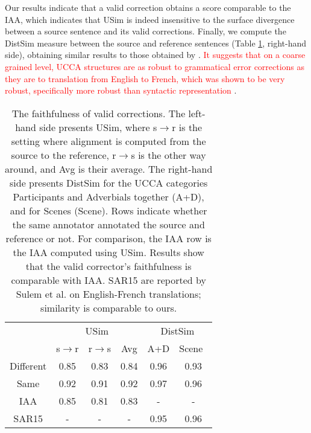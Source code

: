 \documentclass[a4paper, 11pt]{article}
\begin{document}
Our results indicate that a valid correction obtains a score comparable
to the IAA, which indicates that {\sc USim} is indeed
insensitive to the surface divergence between a source sentence and its valid corrections.
Finally, we compute the {\sc DistSim} measure
between the source and reference sentences (Table \ref{tab:Distances}, right-hand side),
obtaining similar results to those obtained by . \textcolor{red}{It suggests that on a coarse grained level, UCCA structures are as robust to grammatical error corrections as they are to translation from English to French, which was shown to be very robust, specifically more robust than syntactic representation \cite{sulem2015conceptual}}.
\begin{table}
	\small
	\centering
	\singlespacing
	\begin{tabular}{c|c|c|c||c|c|}
		\cline{2-6} 
		& \multicolumn{3}{c||}{\sc USim} & \multicolumn{2}{c|}{\sc DistSim}\\ \cline{2-6}
		& s$\rightarrow$r & r$\rightarrow$s & Avg & A+D & Scene\
		\\
		\hline
		Different & 0.85 & 0.83 & 0.84 & 0.96 & 0.93
		\\
		Same & 0.92 & 0.91 & 0.92 & 0.97 & 0.96
		\\
		\hline
		\hline
		IAA & 0.85 & 0.81 & 0.83 & - & -
		\\
		\hline
		SAR15 & - & - & - & 0.95 & 0.96 \\
		\hline
	\end{tabular}
	\caption{\label{tab:Distances}
		The faithfulness of valid corrections.
		The left-hand side presents {\sc USim},
		where s$\rightarrow$r is the setting where alignment is computed from the source to the reference,
		r$\rightarrow$s is the other way around, and Avg is their average.
		The right-hand side presents {\sc DistSim} for the UCCA categories Participants and Adverbials
		together (A+D), and for Scenes (Scene).
		Rows indicate whether the same annotator annotated the source and reference or not.
		For comparison, the IAA row is the IAA computed using {\sc USim}.
		Results show that the valid corrector's faithfulness is comparable with IAA.
		SAR15 are reported by Sulem et al. on English-French
		translations; similarity is comparable to ours.}
\end{table}
\end{document}

